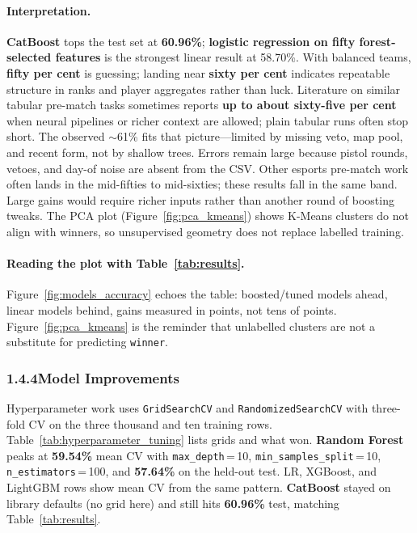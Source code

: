 \documentclass[12pt,a4paper]{article}
\newcommand{\GridSearchCVname}{\texttt{Grid\allowbreak Search\allowbreak CV}}
\newcommand{\RandomizedSearchCVname}{\texttt{Randomized\allowbreak Search\allowbreak CV}}
\begin{document}
\paragraph{Interpretation.}
\textbf{CatBoost} tops the test set at \textbf{60.96\%}; \textbf{logistic regression on fifty forest-selected features} is the strongest linear result at 58.70\%. With balanced teams, \textbf{fifty per cent} is guessing; landing near \textbf{sixty per cent} indicates repeatable structure in ranks and player aggregates rather than luck. Literature on similar tabular pre-match tasks sometimes reports \textbf{up to about sixty-five per cent} when neural pipelines or richer context are allowed; plain tabular runs often stop short. The observed $\sim$61\% fits that picture---limited by missing veto, map pool, and recent form, not by shallow trees. Errors remain large because pistol rounds, vetoes, and day-of noise are absent from the CSV. Other esports pre-match work often lands in the mid-fifties to mid-sixties; these results fall in the same band. Large gains would require richer inputs rather than another round of boosting tweaks. The PCA plot (Figure~\ref{fig:pca_kmeans}) shows K-Means clusters do not align with winners, so unsupervised geometry does not replace labelled training.

\paragraph{Reading the plot with Table~\ref{tab:results}.}
Figure~\ref{fig:models_accuracy} echoes the table: boosted/tuned models ahead, linear models behind, gains measured in points, not tens of points. Figure~\ref{fig:pca_kmeans} is the reminder that unlabelled clusters are not a substitute for predicting \texttt{winner}.

\subsubsection{1.4.4\quad Model Improvements}

Hyperparameter work uses \GridSearchCVname{} and \RandomizedSearchCVname{} with three-fold CV on the three thousand and ten training rows. Table~\ref{tab:hyperparameter_tuning} lists grids and what won. \textbf{Random Forest} peaks at \textbf{59.54\%} mean CV with \texttt{max\_depth}\,{=}\,10, \texttt{min\_samples\_split}\,{=}\,10, \texttt{n\_estimators}\,{=}\,100, and \textbf{57.64\%} on the held-out test. LR, XGBoost, and LightGBM rows show mean CV from the same pattern. \textbf{CatBoost} stayed on library defaults (no grid here) and still hits \textbf{60.96\%} test, matching Table~\ref{tab:results}.
\end{document}
